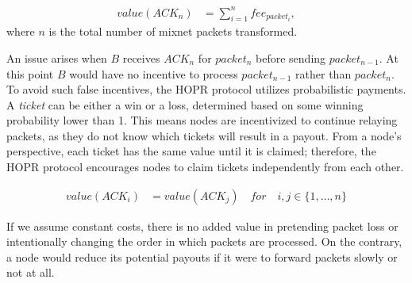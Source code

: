 \begin{align}
    value (ACK_n) & =\sum_{i=1}^nfee_{packet_i},
\end{align}
where $n$ is the total number of mixnet packets transformed.

An issue arises when $B$ receives $ACK_n$ for $packet_n$ before sending $packet_{n-1}$. At this point $B$ would have no incentive to process $packet_{n-1}$ rather than $packet_{n}$. To avoid such false incentives, the HOPR protocol utilizes probabilistic payments. A \textit{ticket} can be either a win or a loss, determined based on some winning probability lower than 1. This means nodes are incentivized to continue relaying packets, as they do not know which tickets will result in a payout. From a node's perspective, each ticket has the same value until it is claimed; therefore, the HOPR protocol encourages nodes to claim tickets independently from each other.

\begin{align}
    value ( ACK_i ) & =value ( ACK_j ) \quad for \quad i,j\in \{1,\dots,n\}
\end{align}

If we assume constant costs, there is no added value in pretending packet loss or intentionally changing the order in which packets are processed. On the contrary, a node would reduce its potential payouts if it were to forward packets slowly or not at all.